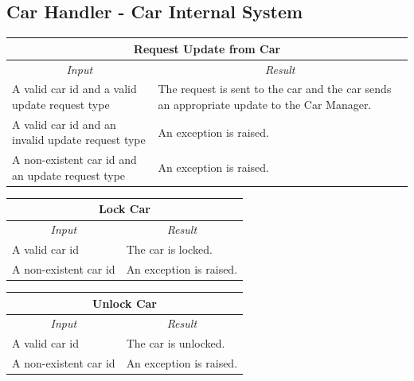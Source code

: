 \documentclass[english]{article}
\begin{document}
\subsection{Car Handler - Car Internal System}

\begin{center}
	\begin{tabular}{ | p{6cm} | p{6cm} | }
		\hline
		\multicolumn{2}{|c|}{\textbf{Request Update from Car}} \\
		\hline
		\multicolumn{1}{|c|}{\textit{Input}} & \multicolumn{1}{c|}{\textit{Result}} \\
		\hline
		A valid car id and a valid update request type & The request is sent to the car and the car sends an appropriate update to the Car Manager. \\
		\hline
		A valid car id and an invalid update request type & An exception is raised. \\
		\hline
		A non-existent car id and an update request type & An exception is raised. \\
		\hline
	\end{tabular}
\end{center}

\begin{center}
	\begin{tabular}{ | p{6cm} | p{6cm} | }
		\hline 
		\multicolumn{2}{|c|}{\textbf{Lock Car}} \\
		\hline
		\multicolumn{1}{|c|}{\textit{Input}} & \multicolumn{1}{c|}{\textit{Result}} \\
		\hline
		A valid car id & The car is locked. \\
		\hline
		A non-existent car id  & An exception is raised. \\
		\hline
	\end{tabular}
\end{center}

\begin{center}
	\begin{tabular}{ | p{6cm} | p{6cm} | }
		\hline 
		\multicolumn{2}{|c|}{\textbf{Unlock Car}} \\
		\hline
		\multicolumn{1}{|c|}{\textit{Input}} & \multicolumn{1}{c|}{\textit{Result}} \\
		\hline
		A valid car id & The car is unlocked. \\
		\hline
		A non-existent car id & An exception is raised. \\
		\hline
	\end{tabular}
\end{center}
\end{document}

